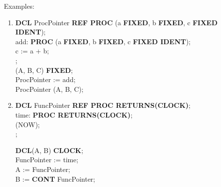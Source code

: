 Examples:
\begin{enumerate}
\item {\bf DCL} ProcPointer {\bf REF PROC} (a {\bf FIXED}, b {\bf FIXED}, c {\bf FIXED IDENT});\\
      add: {\bf PROC} (a {\bf FIXED}, b {\bf FIXED}, c {\bf FIXED IDENT});\\
      \x   c := a + b;\\
      ;\\
       (A, B, C) {\bf FIXED};\\
      ProcPointer := add;\\
      ProcPointer (A, B, C);
\item {\bf DCL} FuncPointer {\bf REF PROC RETURNS(CLOCK)};\\
      time: {\bf PROC RETURNS(CLOCK)};\\
      (NOW);\\
      ;

      {\bf DCL}(A, B) {\bf CLOCK};\\
      FuncPointer := time;\\
      A := FuncPointer;\\
      B := {\bf CONT} FuncPointer;
\end{enumerate}

